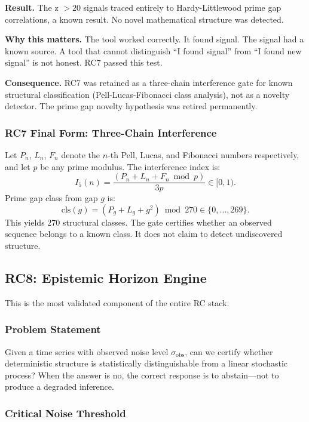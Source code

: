 \documentclass[11pt,twoside]{article}
\begin{document}
\begin{retiredenv}
\textbf{Result.} The z $> 20$ signals traced entirely to Hardy-Littlewood prime gap
correlations, a known result. No novel mathematical structure was detected.

\textbf{Why this matters.} The tool worked correctly. It found signal. The signal
had a known source. A tool that cannot distinguish ``I found signal'' from ``I found
new signal'' is not honest. RC7 passed this test.

\textbf{Consequence.} RC7 was retained as a three-chain interference gate for
known structural classification (Pell-Lucas-Fibonacci class analysis), not as a
novelty detector. The prime gap novelty hypothesis was retired permanently.
\end{retiredenv}

\subsubsection{RC7 Final Form: Three-Chain Interference}

Let $P_n$, $L_n$, $F_n$ denote the $n$-th Pell, Lucas, and Fibonacci numbers
respectively, and let $p$ be any prime modulus. The interference index is:
\[
  I_5(n) = \frac{(P_n + L_n + F_n \bmod p)}{3p} \in [0,1).
\]
Prime gap class from gap $g$ is:
\[
  \mathrm{cls}(g) = (P_g + L_g + g^2) \bmod 270 \in \{0, \ldots, 269\}.
\]
This yields 270 structural classes. The gate certifies whether an observed sequence
belongs to a known class. It does not claim to detect undiscovered structure.

\subsection{RC8: Epistemic Horizon Engine}

This is the most validated component of the entire RC stack.

\subsubsection{Problem Statement}

Given a time series with observed noise level $\sigma_{\mathrm{obs}}$, can we certify
whether deterministic structure is statistically distinguishable from a linear
stochastic process? When the answer is no, the correct response is to abstain---not
to produce a degraded inference.

\subsubsection{Critical Noise Threshold}
\end{document}
